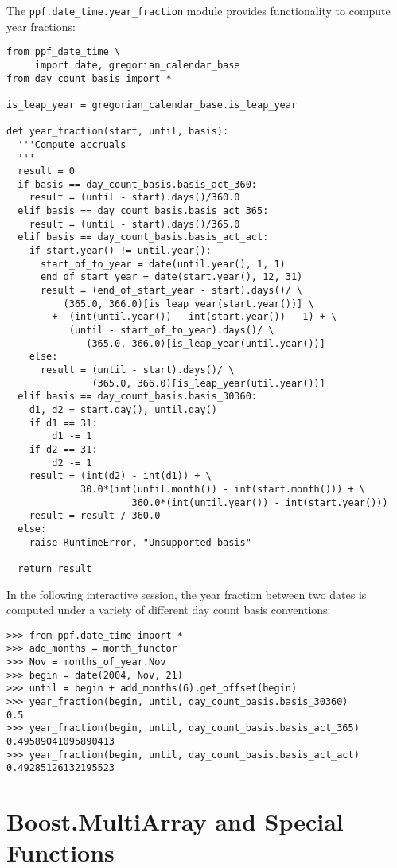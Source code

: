The \verb|ppf.date_time.year_fraction| module provides functionality
to compute year fractions:
\begin{verbatim}
from ppf_date_time \
     import date, gregorian_calendar_base
from day_count_basis import *

is_leap_year = gregorian_calendar_base.is_leap_year

def year_fraction(start, until, basis):
  '''Compute accruals
  '''
  result = 0
  if basis == day_count_basis.basis_act_360:
    result = (until - start).days()/360.0
  elif basis == day_count_basis.basis_act_365:
    result = (until - start).days()/365.0
  elif basis == day_count_basis.basis_act_act:
    if start.year() != until.year():
      start_of_to_year = date(until.year(), 1, 1)
      end_of_start_year = date(start.year(), 12, 31)
      result = (end_of_start_year - start).days()/ \
          (365.0, 366.0)[is_leap_year(start.year())] \
        +  (int(until.year()) - int(start.year()) - 1) + \
           (until - start_of_to_year).days()/ \
              (365.0, 366.0)[is_leap_year(until.year())]
    else:
      result = (until - start).days()/ \
               (365.0, 366.0)[is_leap_year(util.year())]
  elif basis == day_count_basis.basis_30360:
    d1, d2 = start.day(), until.day()
    if d1 == 31:
        d1 -= 1
    if d2 == 31:
        d2 -= 1
    result = (int(d2) - int(d1)) + \
             30.0*(int(until.month()) - int(start.month())) + \
                      360.0*(int(until.year()) - int(start.year()))
    result = result / 360.0
  else:
    raise RuntimeError, "Unsupported basis"

  return result
\end{verbatim}
In the following interactive session, the year fraction between
two dates is computed under a variety of different day count basis
conventions:
\begin{verbatim}
>>> from ppf.date_time import *
>>> add_months = month_functor
>>> Nov = months_of_year.Nov
>>> begin = date(2004, Nov, 21)
>>> until = begin + add_months(6).get_offset(begin)
>>> year_fraction(begin, until, day_count_basis.basis_30360)
0.5
>>> year_fraction(begin, until, day_count_basis.basis_act_365)
0.49589041095890413
>>> year_fraction(begin, until, day_count_basis.basis_act_act)
0.49285126132195523
\end{verbatim}

\section{Boost.MultiArray and Special Functions}

